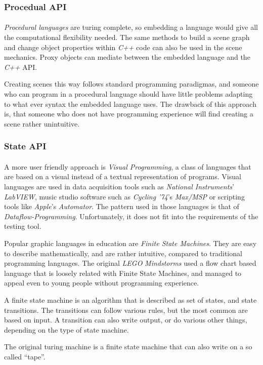 \subsubsection{Procedual API}
\paragraph{}
\textit{Procedural languages} are turing complete, so embedding a language would give all the computational flexibility needed. The same methods to build a scene graph and change object properties within \textit{C++} code can also be used in the scene mechanics. Proxy objects can mediate between the embedded language and the \textit{C++} API.

Creating scenes this way follows standard programming paradigmas, and someone who can program in a procedural language should have little problems adapting to what ever syntax the embedded language uses. The drawback of this approach is, that someone who does not have programming experience will find creating a scene rather unintuitive.

\subsubsection{State API}
\paragraph{}
A more user friendly approach is \textit{Visual Programming}, a class of languages that are based on a visual instead of a textual representation of programs. Visual languages are used in data acquisition tools such as \textit{National Instruments}' \textit{LabVIEW}, music studio software such as \textit{Cycling '74}'s \textit{Max/MSP} or scripting tools like \textit{Apple}'s \textit{Automator}.
The pattern used in those languages is that of \textit{Dataflow-Programming}\cite{dataflow}. Unfortunately, it does not fit into the requirements of the testing tool.

Popular graphic languages in education are \textit{Finite State Machines}\cite{fsm}. They are easy to describe mathematically, and are rather intuitive, compared to traditional programming languages.
The original \textit{LEGO} \textit{Mindstorms} used a flow chart based language that is loosely related with Finite State Machines, and managed to appeal even to young people without programming experience.

A finite state machine is an algorithm that is described as set of states, and state transitions. The transitions can follow various rules, but the most common are based on input. A transition can also write output, or do various other things, depending on the type of state machine.

The original turing machine is a finite state machine that can also write on a so called ``tape''.

